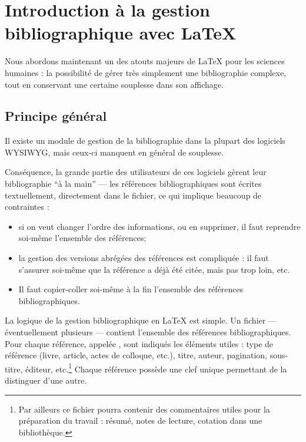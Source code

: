 \chapter[Introduction]{Introduction à la gestion bibliographique avec \LaTeX{}}
\begin{intro}
Nous abordons maintenant un des atouts majeurs de \LaTeX{} pour les sciences humaines : la possibilité de gérer très simplement une bibliographie complexe, tout en conservant une certaine souplesse dans son affichage.

\end{intro}
\section{Principe général}



Il existe un module de gestion de la bibliographie dans la plupart des logiciels WYSIWYG, mais ceux-ci manquent en général de souplesse.

Conséquence, la grande partie des utilisateurs de ces logiciels gèrent leur bibliographie \enquote{à la main} --- les références bibliographiques sont écrites textuellement, directement dans le fichier, ce qui implique beaucoup de contraintes  :
\begin{itemize}
\item si on veut changer l'ordre des informations, ou en supprimer, il faut reprendre soi-même l'ensemble des références;
\item la gestion des versions abrégées des références est  compliquée :  il faut s'assurer soi-même que la référence a déjà été citée, mais pas trop loin, etc. 
\item Il faut copier-coller soi-même à la fin l'ensemble des références bibliographiques. 
\end{itemize}

La logique de la gestion bibliographique en \LaTeX{} est  simple. Un fichier   --- éventuellement plusieurs --- contient l'ensemble des références bibliographiques. Pour chaque référence, appelée , sont indiqués les éléments utiles :  type de référence (livre, article, actes de colloque, etc.), titre, auteur, pagination, sous-titre, éditeur, etc.\footnote{Par ailleurs ce fichier pourra contenir des commentaires utiles pour la préparation du travail : résumé, notes de lecture, cotation dans une bibliothèque.} Chaque référence possède une clef unique permettant de la distinguer d'une autre.

